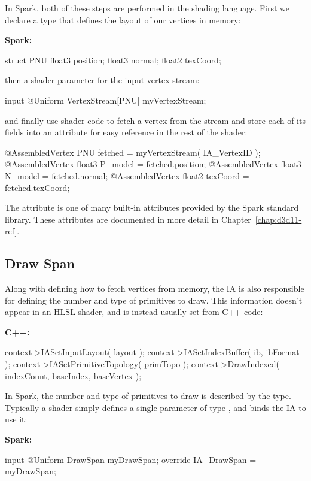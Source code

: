 \documentclass[]{report}
\newenvironment{codeblock}%
{\begin{center}\begin{codebox}}%
{\end{codebox}\end{center}}
\newcommand{\codeblockheader}[1]{\textbf{\small #1: }}
\newenvironment{codeblockx}[1]%
{\begin{center}\begin{codebox} \codeblockheader{#1}}%
{\end{codebox}\end{center}}
\newcommand{\code}[1]{\text{\lstinline[style=spark_style]{#1}}}
\newcommand{\kw}[1]{\text{\texttt{\textbf{\textcolor{keyword_color}{#1}}}}}
\begin{document}
In Spark, both of these steps are performed in the shading language.
First we declare a \kw{struct} type that defines the layout of our vertices in memory:
\begin{codeblockx}{Spark}
\begin{spark}
struct PNU
{
    float3 position;
    float3 normal;
    float2 texCoord;
}
\end{spark}
\end{codeblockx}
then a shader parameter for the input vertex stream:
\begin{codeblock}
\begin{spark}
input @Uniform VertexStream[PNU] myVertexStream;
\end{spark}
\end{codeblock}
and finally use shader code to fetch a vertex \kw{struct} from the stream and store each of its fields into an attribute for easy reference in the rest of the shader:
\begin{codeblock}
\begin{spark}
@AssembledVertex PNU fetched = myVertexStream( IA_VertexID );
@AssembledVertex float3 P_model = fetched.position;
@AssembledVertex float3 N_model = fetched.normal;
@AssembledVertex float2 texCoord = fetched.texCoord;
\end{spark}
\end{codeblock}
The attribute \code{IA\_VertexID} is one of many built-in attributes provided by the Spark standard library.
These attributes are documented in more detail in Chapter~\ref{chap:d3d11-ref}.

\subsection{Draw Span}

Along with defining how to fetch vertices from memory, the IA is also responsible for defining the number and type of primitives to draw.
This information doesn't appear in an HLSL shader, and is instead usually set from C++ code:
\begin{codeblockx}{C++}
\begin{cplusplus}
context->IASetInputLayout( layout );
context->IASetIndexBuffer( ib, ibFormat );
context->IASetPrimitiveTopology( primTopo );
context->DrawIndexed( indexCount, baseIndex, baseVertex );
\end{cplusplus}
\end{codeblockx}

In Spark, the number and type of primitives to draw is described by the \code{DrawSpan} type.
Typically a shader simply defines a single parameter of type \code{DrawSpan}, and binds the IA to use it:
\begin{codeblockx}{Spark}
\begin{spark}
input @Uniform DrawSpan myDrawSpan;
override IA_DrawSpan = myDrawSpan;
\end{spark}
\end{codeblockx}
\end{document}
